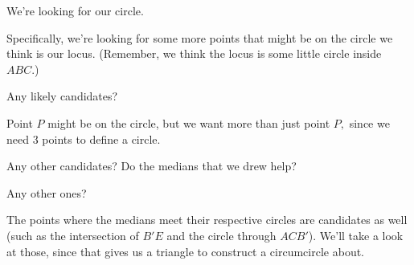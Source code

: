 




We're looking for our circle.

Specifically, we're looking for some more points that might be on the circle we think is our locus. (Remember, we think the locus is some little circle inside $ABC.$)

Any likely candidates?


Point $P$ might be on the circle, but we want more than just point $P,$ since we need $3$ points to define a circle.

Any other candidates? Do the medians that we drew help?




Any other ones?

The points where the medians meet their respective circles are candidates as well (such as the intersection of $B'E$ and the circle through $ACB'$). We'll take a look at those, since that gives us a triangle to construct a circumcircle about.




